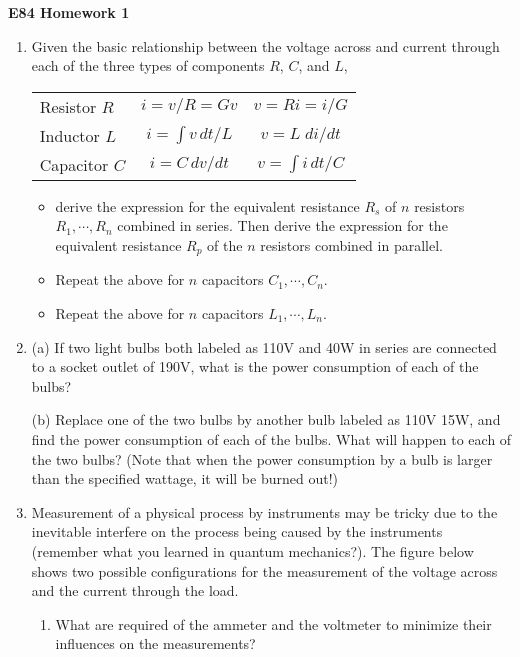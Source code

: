 \usepackage{html}

\begin{center}
{\Large \bf E84 Homework 1}
\end{center}
\begin{enumerate}

\item Given the basic relationship between the voltage across and
  current through each of the three types of components $R$, $C$,
  and $L$,
  \begin{tabular}{l|cc}
    Resistor $R$ & $i=v/R=Gv$ & $v=Ri=i/G$ \\
    Inductor $L$ & $i=\int v\,dt/L$ & $v=L\;di/dt$ \\
    Capacitor $C$ & $i=C\,dv/dt$ & $v=\int i\,dt/C$ \\
  \end{tabular}
  \begin{itemize}
  \item derive the expression for the equivalent resistance $R_s$
    of $n$ resistors $R_1,\cdots,R_n$ combined in series. Then derive 
    the expression for the equivalent resistance $R_p$ of the $n$ 
    resistors combined in parallel.
  \item Repeat the above for $n$ capacitors $C_1,\cdots,C_n$.
  \item Repeat the above for $n$ capacitors $L_1,\cdots,L_n$.
  \end{itemize}

\item (a) If two light bulbs both labeled as 110V and 40W in series are
connected to a socket outlet of 190V, what is the power consumption of 
each of the bulbs?

(b) Replace one of the two bulbs by another bulb labeled as 110V 15W, and
find the power consumption of each of the bulbs. What will happen to each
of the two bulbs? (Note that when the power consumption by a bulb is larger
than the specified wattage, it will be burned out!)

\item Measurement of a physical process by instruments may be tricky due 
  to the inevitable interfere on the process being caused by the instruments
  (remember what you learned in quantum mechanics?). The figure below shows 
  two possible configurations for the measurement of the voltage across and 
  the current through the load. 


\begin{enumerate}
\item What are required of the ammeter and the voltmeter to minimize their
	influences on the measurements? 


\end{enumerate}
\end{enumerate}
